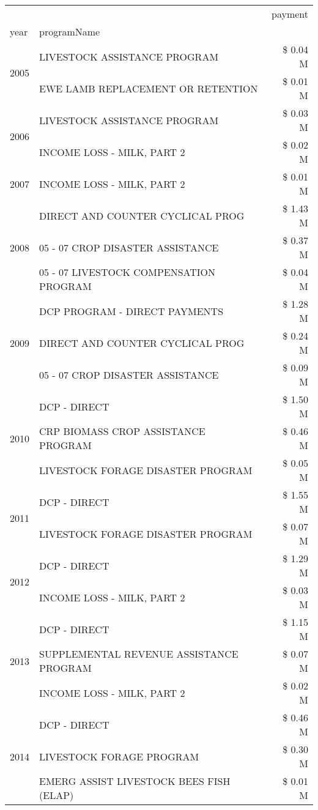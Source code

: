 \begin{tabular}{llr}
\toprule
 &  & payment \\
year & programName &  \\
\midrule
\multirow[t]{2}{*}{2005} & LIVESTOCK ASSISTANCE PROGRAM & \$ 0.04 M \\
 & EWE LAMB REPLACEMENT OR RETENTION & \$ 0.01 M \\
\cline{1-3}
\multirow[t]{2}{*}{2006} & LIVESTOCK ASSISTANCE PROGRAM & \$ 0.03 M \\
 & INCOME LOSS - MILK, PART 2 & \$ 0.02 M \\
\cline{1-3}
2007 & INCOME LOSS - MILK, PART 2 & \$ 0.01 M \\
\cline{1-3}
\multirow[t]{3}{*}{2008} & DIRECT AND COUNTER CYCLICAL PROG & \$ 1.43 M \\
 & 05 - 07 CROP DISASTER ASSISTANCE & \$ 0.37 M \\
 & 05 - 07 LIVESTOCK COMPENSATION PROGRAM & \$ 0.04 M \\
\cline{1-3}
\multirow[t]{3}{*}{2009} & DCP PROGRAM - DIRECT PAYMENTS & \$ 1.28 M \\
 & DIRECT AND COUNTER CYCLICAL PROG & \$ 0.24 M \\
 & 05 - 07 CROP DISASTER ASSISTANCE & \$ 0.09 M \\
\cline{1-3}
\multirow[t]{3}{*}{2010} & DCP - DIRECT & \$ 1.50 M \\
 & CRP BIOMASS CROP ASSISTANCE PROGRAM & \$ 0.46 M \\
 & LIVESTOCK FORAGE DISASTER PROGRAM & \$ 0.05 M \\
\cline{1-3}
\multirow[t]{2}{*}{2011} & DCP - DIRECT & \$ 1.55 M \\
 & LIVESTOCK FORAGE DISASTER PROGRAM & \$ 0.07 M \\
\cline{1-3}
\multirow[t]{2}{*}{2012} & DCP - DIRECT & \$ 1.29 M \\
 & INCOME LOSS - MILK, PART 2 & \$ 0.03 M \\
\cline{1-3}
\multirow[t]{3}{*}{2013} & DCP - DIRECT & \$ 1.15 M \\
 & SUPPLEMENTAL REVENUE ASSISTANCE PROGRAM & \$ 0.07 M \\
 & INCOME LOSS - MILK, PART 2 & \$ 0.02 M \\
\cline{1-3}
\multirow[t]{3}{*}{2014} & DCP - DIRECT & \$ 0.46 M \\
 & LIVESTOCK FORAGE PROGRAM & \$ 0.30 M \\
 & EMERG ASSIST LIVESTOCK BEES FISH (ELAP) & \$ 0.01 M \\
\cline{1-3}

\end{tabular}
